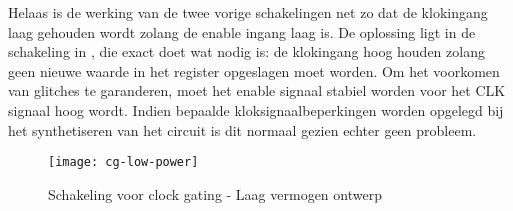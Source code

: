 Helaas is de werking van de twee vorige schakelingen net zo dat de klokingang laag gehouden wordt zolang de enable ingang laag is. De oplossing ligt in de schakeling in , die exact doet wat nodig is: de klokingang hoog houden zolang geen nieuwe waarde in het register opgeslagen moet worden. Om het voorkomen van glitches te garanderen, moet het enable signaal stabiel worden voor het CLK signaal hoog wordt. Indien bepaalde kloksignaalbeperkingen worden opgelegd bij het synthetiseren van het circuit is dit normaal gezien echter geen probleem.

\begin{figure}[h]
	\centering
		\texttt{[image: cg-low-power]}
		\caption{Schakeling voor clock gating - Laag vermogen ontwerp\label{figuur-implementatie-optimalisatie-cg-low-power}}
\end{figure}
